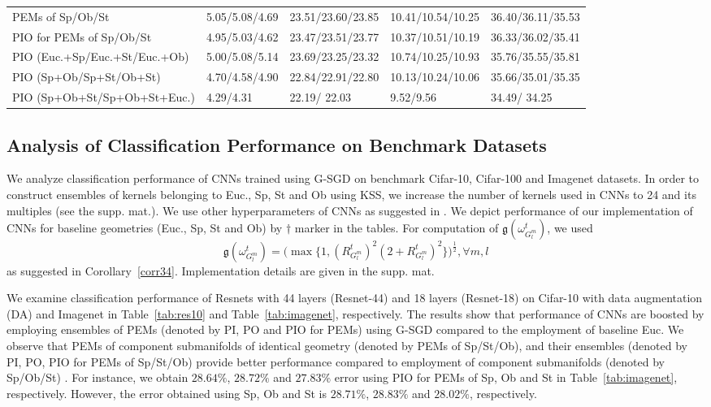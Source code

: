 \documentclass[10pt,journal,compsoc]{IEEEtran}
\theoremstyle{definition}
\theoremstyle{definition}
\theoremstyle{remark}
\theoremstyle{remark}
\theoremstyle{remark}
\begin{document}
\begin{table*}[ht]
\begin{tabular}{C{4.8cm}|C{1.7cm}|C{2.250cm}|C{2.69cm}|C{2.69cm}|}
		PEMs of Sp/Ob/St & 5.05/5.08/{{4.69}}  & 23.51/23.60/{{23.85}} & 10.41/10.54/{{10.25}} & 36.40/36.11/{{35.53}} \\
		PIO for PEMs of Sp/Ob/St & 4.95/5.03/{{4.62}}  & 23.47/23.51/{{23.77}} & 10.37/10.51/{{10.19}} & 36.33/36.02/{{35.41}} \\		
		PIO   (Euc.+Sp/Euc.+St/Euc.+Ob)  & 5.00/5.08/5.14  & 23.69/23.25/23.32  & 10.74/10.25/10.93  & 35.76/35.55/35.81 \\	
		PIO   (Sp+Ob/Sp+St/Ob+St)  & 4.70/4.58/4.90  & 22.84/22.91/22.80  & 10.13/10.24/10.06  & 35.66/35.01/35.35 \\		
		PIO (Sp+Ob+St/Sp+Ob+St+Euc.)  & {\color{blue} 4.29}/4.31   & 22.19/{\color{blue} 22.03}  &  {\color{blue} 9.52}/9.56 & 34.49/{\color{blue} 34.25} \\
		\bottomrule
		\bottomrule
								
	\end{tabular}%
	\label{tab:rcd}%
\end{table*}%


\subsection{Analysis of Classification Performance on Benchmark Datasets}

We analyze classification performance of CNNs trained using G-SGD on benchmark Cifar-10, Cifar-100 and Imagenet datasets. In order to construct ensembles of kernels belonging to Euc., Sp, St and Ob using KSS, we increase the number of kernels used in CNNs to 24 and its multiples (see the supp. mat.). We use other hyperparameters of CNNs as suggested in  \cite{res_net,SN,oo16}. We depict performance of our implementation of  CNNs for baseline geometries (Euc., Sp, St and Ob) by $\dagger$ marker in the tables. For computation of  $\mathfrak{g}(\omega_{G^m_l}^t)$, we used 
\begin{equation}{\mathfrak{g}(\omega_{G^m_l}^t) = (\max\{ 1, (R_{G^m_l}^{t})^2(2+R_{G^m_l}^{t})^2 \} })^{\frac{1}{2}}, \forall m,l
\end{equation}
as suggested in Corollary~\ref{corr34}. Implementation details are given in the supp. mat.  

We examine classification performance of Resnets with 44 layers (Resnet-44) and 18 layers (Resnet-18) on Cifar-10  with data augmentation (DA) and Imagenet in Table~\ref{tab:res10} and Table~\ref{tab:imagenet}, respectively. The results show that performance of CNNs are boosted by employing ensembles of PEMs (denoted by PI, PO and PIO for PEMs) using G-SGD compared to the employment of baseline Euc. We observe that PEMs of component submanifolds of identical geometry (denoted by PEMs of Sp/St/Ob), and their ensembles (denoted by PI, PO, PIO for PEMs of Sp/St/Ob)  provide better performance compared to employment of component submanifolds (denoted by Sp/Ob/St) \cite{oo16}. For instance, we obtain $28.64\%$, $28.72\%$ and $27.83\%$ error using PIO for PEMs of Sp, Ob and St in Table~\ref{tab:imagenet}, respectively. However, the error obtained using Sp, Ob and St is $28.71\%$, $28.83\%$ and $28.02\%$, respectively.
\end{document}
